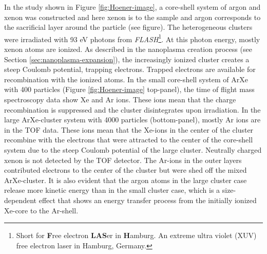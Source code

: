 In the study shown in Figure \ref{fig:Hoener-image}, a core-shell system of argon and xenon was constructed and here xenon is to the sample and argon corresponds to the sacrificial layer around the particle (see figure). The heterogeneous clusters were irradiated with 93 eV photons from \textit{FLASH}\footnote{Short for \textbf{F}ree electron \textbf{LAS}er in \textbf{H}amburg. An extreme ultra violet (XUV) free electron laser in Hamburg, Germany.}. At this photon energy, mostly xenon atoms are ionized. As described in the nanoplasma creation process (see Section \ref{sec:nanoplasma-expansion}), the increasingly ionized cluster creates a steep Coulomb potential, trapping electrons. Trapped electrons are available for recombination with the ionized atoms. In the small core-shell system of ArXe with 400 particles (Figure \ref{fig:Hoener-image} top-panel), the time of flight mass spectroscopy data show Xe and Ar ions. These ions mean that the charge recombination is suppressed and the cluster disintegrates upon irradiation. In the large ArXe-cluster system with 4000 particles (bottom-panel), mostly Ar ions are in the TOF data. These ions mean that the Xe-ions in the center of the cluster recombine with the electrons that were attracted to the center of the core-shell system due to the steep Coulomb potential of the large cluster. Neutrally charged xenon is not detected by the TOF detector. The Ar-ions in the outer layers contributed electrons to the center of the cluster but were shed off the mixed ArXe-cluster. It is also evident that the argon atoms in the large cluster case release more kinetic energy than in the small cluster case, which is a size-dependent effect that shows an energy transfer process from the initially ionized Xe-core to the Ar-shell.
%
%
%
%